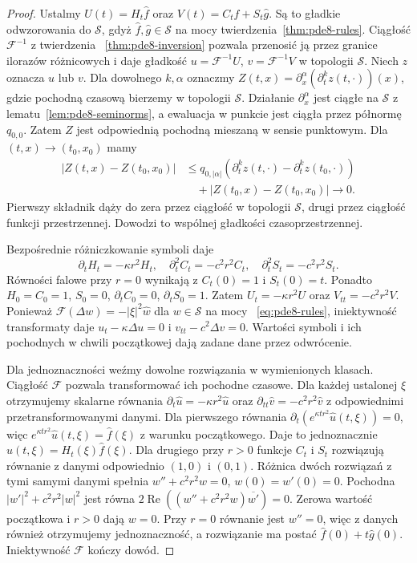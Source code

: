\begin{proof}
Ustalmy
$U(t)=H_t\widehat f$ oraz
$V(t)=C_t\widehat f+S_t\widehat g$.
Są to gładkie odwzorowania do $\mathcal S$,
gdyż $\widehat f,\widehat g\in\mathcal S$
na mocy twierdzenia~\ref{thm:pde8-rules}.
Ciągłość $\mathcal F^{-1}$ z twierdzenia
~\ref{thm:pde8-inversion} pozwala przenosić
ją przez granice ilorazów różnicowych
i daje gładkość $u=\mathcal F^{-1}U$,
$v=\mathcal F^{-1}V$ w topologii $\mathcal S$.
Niech $z$ oznacza $u$ lub $v$.
Dla dowolnego $k,\alpha$ oznaczmy
$Z(t,x)=\partial_x^\alpha(\partial_t^k z(t,\cdot))(x)$,
gdzie pochodną czasową bierzemy w topologii $\mathcal S$.
Działanie $\partial_x^\alpha$ jest ciągłe
na $\mathcal S$ z lematu~\ref{lem:pde8-seminorms},
a ewaluacja w punkcie jest ciągła przez półnormę
$q_{0,0}$. Zatem $Z$ jest odpowiednią pochodną
mieszaną w sensie punktowym. Dla $(t,x)\to(t_0,x_0)$
mamy
\[
 \begin{aligned}
 |Z(t,x)-Z(t_0,x_0)|
 &\le q_{0,|\alpha|}(\partial_t^k z(t,\cdot)
                       -\partial_t^k z(t_0,\cdot))\\
 &\quad+|Z(t_0,x)-Z(t_0,x_0)|\longrightarrow0.
 \end{aligned}
\]
Pierwszy składnik dąży do zera przez ciągłość
w topologii $\mathcal S$, drugi przez ciągłość
funkcji przestrzennej. Dowodzi to wspólnej
gładkości czasoprzestrzennej.

Bezpośrednie różniczkowanie symboli daje
\[
 \partial_t H_t=-\kappa r^2 H_t,\quad
 \partial_t^2 C_t=-c^2r^2 C_t,\quad
 \partial_t^2 S_t=-c^2r^2 S_t.
\]
Równości falowe przy $r=0$ wynikają z
$C_t(0)=1$ i $S_t(0)=t$.
Ponadto $H_0=C_0=1$, $S_0=0$,
$\partial_t C_0=0$, $\partial_t S_0=1$.
Zatem $U_t=-\kappa r^2U$ oraz
$V_{tt}=-c^2r^2V$. Ponieważ
$\mathcal F(\Delta w)=-|\xi|^2\widehat w$
dla $w\in\mathcal S$ na mocy
~\eqref{eq:pde8-rules}, iniektywność transformaty
daje $u_t-\kappa\Delta u=0$ i
$v_{tt}-c^2\Delta v=0$.
Wartości symboli i ich pochodnych w chwili
początkowej dają zadane dane przez odwrócenie.

Dla jednoznaczności weźmy dowolne rozwiązania
w wymienionych klasach. Ciągłość $\mathcal F$
pozwala transformować ich pochodne czasowe.
Dla każdej ustalonej $\xi$ otrzymujemy
skalarne równania
$\partial_t\widehat u=-\kappa r^2\widehat u$ oraz
$\partial_{tt}\widehat v=-c^2r^2\widehat v$
z odpowiednimi przetransformowanymi danymi.
Dla pierwszego równania
$\partial_t(e^{\kappa tr^2}\widehat u(t,\xi))=0$,
więc $e^{\kappa tr^2}\widehat u(t,\xi)=\widehat f(\xi)$
z warunku początkowego. Daje to jednoznacznie
$\widehat u(t,\xi)=H_t(\xi)\widehat f(\xi)$.
Dla drugiego przy $r>0$ funkcje $C_t$ i $S_t$
rozwiązują równanie z danymi odpowiednio $(1,0)$
i $(0,1)$. Różnica dwóch rozwiązań z tymi samymi
danymi spełnia $w''+c^2r^2w=0$, $w(0)=w'(0)=0$.
Pochodna $|w'|^2+c^2r^2|w|^2$ jest równa
$2\operatorname{Re}((w''+c^2r^2w)\overline{w'})=0$.
Zerowa wartość początkowa i $r>0$ dają $w=0$.
Przy $r=0$ równanie jest $w''=0$, więc z danych
również otrzymujemy jednoznaczność, a rozwiązanie
ma postać $\widehat f(0)+t\widehat g(0)$.
Iniektywność $\mathcal F$ kończy dowód.
\end{proof}

